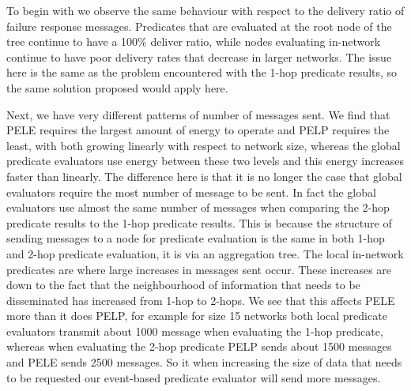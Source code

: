 To begin with we observe the same behaviour with respect to the delivery ratio of failure response messages. Predicates that are evaluated at the root node of the tree continue to have a 100\% deliver ratio, while nodes evaluating in-network continue to have poor delivery rates that decrease in larger networks. The issue here is the same as the problem encountered with the 1-hop predicate results, so the same solution proposed would apply here.

Next, we have very different patterns of number of messages sent. We find that PELE requires the largest amount of energy to operate and PELP requires the least, with both growing linearly with respect to network size, whereas the global predicate evaluators use energy between these two levels and this energy increases faster than linearly. The difference here is that it is no longer the case that global evaluators require the most number of message to be sent. In fact the global evaluators use almost the same number of messages when comparing the 2-hop predicate results to the 1-hop predicate results. This is because the structure of sending messages to a node for predicate evaluation is the same in both 1-hop and 2-hop predicate evaluation, it is via an aggregation tree. The local in-network predicates are where large increases in messages sent occur. These increases are down to the fact that the neighbourhood of information that needs to be disseminated has increased from 1-hop to 2-hops. We see that this affects PELE more than it does PELP, for example for size 15 networks both local predicate evaluators transmit about 1000 message when evaluating the 1-hop predicate, whereas when evaluating the 2-hop predicate PELP sends about 1500 messages and PELE sends 2500 messages. So it when increasing the size of data that needs to be requested our event-based predicate evaluator will send more messages.

